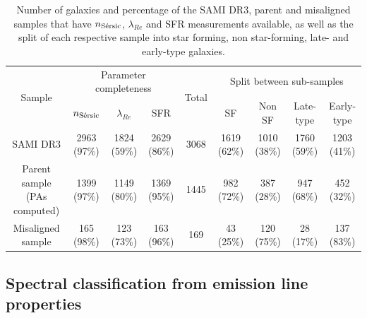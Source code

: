 \documentclass[fleqn,usenatbib]{mnras}
\begin{document}

\begin{table}
\centering
\caption{Number of galaxies and percentage of the SAMI DR3, parent and misaligned samples that have $n_{\rm{S\Acute{e}rsic}}$, $\lambda_{Re}$ and SFR measurements available, as well as the split of each respective sample into star forming, non star-forming, late- and early-type galaxies.}\label{tab1}
\begin{tabular*}{\textwidth}{@{\extracolsep{\fill}}ccccccc|cc} 
\hline
\multirow{2}{*}{Sample}      & \multicolumn{3}{c}{Parameter completeness} & \multirow{2}{*}{Total}  & \multicolumn{4}{c}{Split between sub-samples}  \\
                             & $n_{\rm{S\Acute{e}rsic}}$  & $\lambda_{Re}$     & SFR                         & \multicolumn{1}{l}{} & SF &  Non SF & Late-type & Early-type                                        \\ 
\hline
SAMI DR3                     & 2963 (97\%) & 1824 (59\%) & 2629 (86\%) & 3068  &  1619 (62\%) & 1010 (38\%) & 1760 (59\%) & 1203 (41\%)                                                      \\
Parent sample (PAs computed) & 1399 (97\%) & 1149 (80\%) & 1369 (95\%)                      & 1445 & 982 (72\%) & 387 (28\%) & 947 (68\%) & 452 (32\%)                                                           \\Misaligned sample            & 165 (98\%)  & 123 (73\%)  & 163 (96\%)                         & 169 &  43 (25\%) & 120 (75\%) & 28 (17\%) & 137 (83\%)                                                         \\
\hline
\end{tabular*}
\label{Table1}
\end{table}

\subsection{Spectral classification from emission line properties}
\label{sec:spectral_class_method}
\end{document}
